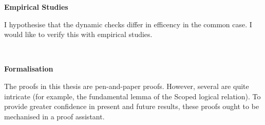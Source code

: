 \noindent\begin{minipage}[t]{0.25\textwidth}
  \textbf{\textsf{Empirical Studies}}
\end{minipage}%
\begin{minipage}[t]{0.75\textwidth}
  I hypothesise that the dynamic checks differ in efficency in the common case. I would like to verify this with empirical studies.

  \vspace{4mm}
\end{minipage}\\

\noindent\begin{minipage}[t]{0.25\textwidth}
  \textbf{\textsf{Formalisation}}
\end{minipage}%
\begin{minipage}[t]{0.75\textwidth}
  The proofs in this thesis are pen-and-paper proofs. However, several are quite intricate (for example, the fundamental lemma of the \textsf{Scoped} logical relation). To provide greater confidence in present and future results, these proofs ought to be mechanised in a proof assistant.
\end{minipage}







